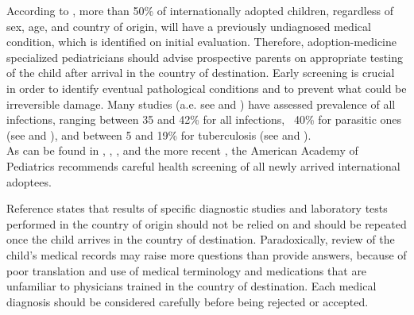 According to \cite{medicalscreening}, more than 50\% of internationally adopted children, regardless of sex, age, and country of origin, will have a previously undiagnosed medical condition, which is identified on initial evaluation. Therefore, adoption-medicine specialized pediatricians should advise prospective parents on appropriate testing of the child after arrival in the country of destination. Early screening is crucial in order to identify eventual pathological conditions and to prevent what could be irreversible damage. Many studies (a.e. see \cite{notonlyinfectious} and \cite{obringer}) have assessed prevalence of all infections, ranging between 35 and 42\% for all infections, ~40\% for parasitic ones (see \cite{GNLBIexp} and \cite{sollai}), and between 5 and 19\% for tuberculosis (see \cite{sollai} and \cite{ampofo}).\\
As can be found in \cite{initialeval}, \cite{redbook}, \cite{GNLBIexp}, and the more recent \cite{comphealtheval}, the American Academy of Pediatrics recommends careful health screening of all newly arrived international adoptees.

Reference \cite{nelson} states that results of specific diagnostic studies and laboratory tests performed in the country of origin should not be relied on and should be repeated once the child arrives in the country of destination. Paradoxically, review of the child’s medical records may raise more questions than provide answers, because of poor translation and use of medical terminology and medications that are unfamiliar to physicians trained in the country of destination. Each medical diagnosis should be considered carefully before being rejected or accepted.


